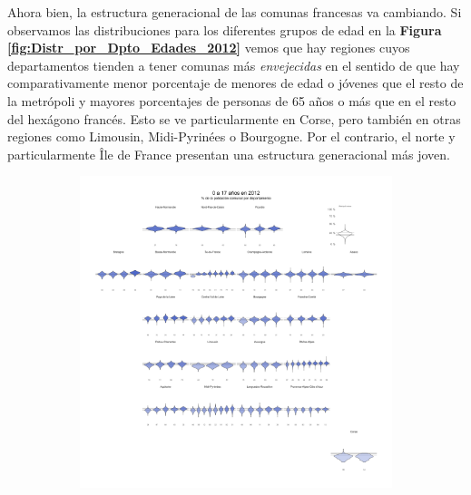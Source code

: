 Ahora bien, la estructura generacional de las comunas francesas va cambiando. Si observamos las distribuciones para los diferentes grupos de edad en la \textbf{Figura \ref{fig:Distr_por_Dpto_Edades_2012}} vemos que hay regiones cuyos departamentos tienden a tener comunas más \textit{envejecidas} en el sentido de que hay comparativamente menor porcentaje de menores de edad o jóvenes que el resto de la metrópoli y mayores porcentajes de personas de 65 años o más que en el resto del hexágono francés. Esto se ve particularmente en Corse, pero también en otras regiones como Limousin, Midi-Pyrinées o Bourgogne. Por el contrario, el norte y particularmente Île de France presentan una estructura generacional más joven.\\

\begin{figure}[h]
	\centering
	\begin{subfigure}{0.3\textwidth}
	\includegraphics[width = \textwidth]{Figs/AED/Geofacet_Distr_por_Dpto_Ed1_2012}
	\end{subfigure}
	~
	\begin{subfigure}{0.3\textwidth}

\end{subfigure}
\end{figure}
